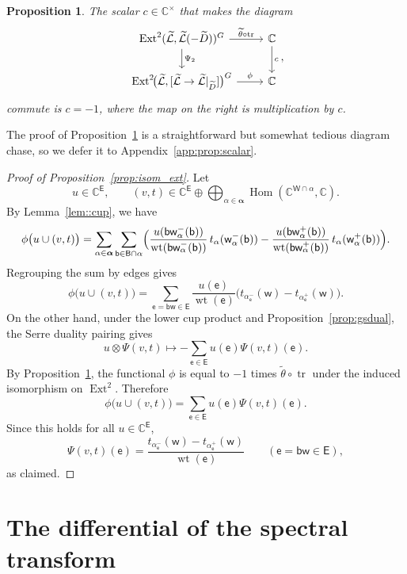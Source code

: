 \documentclass[dvipsnames,11pt]{article}
\newtheorem{proposition}[theorem]{Proposition}
\theoremstyle{definition}
\newcommand{\wt}{\operatorname{wt}}
\newcommand{\C}{{\mathbb C}}
\def\B{\mathsf B}
\def\W{\mathsf W}
\def\w{\mathsf w}
\def\b{\mathsf b}
\def\e{\mathsf e}
\def\E{\mathsf E}
\def\zz{\bm \alpha}
\def\Ext{\operatorname{Ext}}
\def\Ext{\operatorname{Ext}}
\DeclareMathOperator{\Hom}{Hom}
\DeclareMathOperator{\tr}{tr}
\begin{document}
\begin{proposition} \label{prop:scalar}
The scalar $c \in \C^\times$ that makes the diagram
\[
\begin{tikzcd}
 \Ext^2(\widetilde{\mathcal L},\widetilde{\mathcal L}(-\widetilde D))^G \arrow[r,"{\widetilde \theta\circ\tr}"]  \arrow[d,"\Psi_2"]
& \C \arrow[d,"c"]\\
\Ext^2\!\bigl(\widetilde{\mathcal L},[\widetilde{\mathcal L}\to \widetilde{\mathcal L}|_{\widetilde D}]\bigr)^G  \arrow[r,"\phi"]
&  \C
\end{tikzcd},
\]
commute is $c=-1$, where the map on the right is multiplication by $c$. 
\end{proposition}

The proof of Proposition~\ref{prop:scalar} is a straightforward but somewhat tedious diagram chase, so we defer it to Appendix~\ref{app:prop:scalar}.

\begin{proof}[Proof of Proposition~\ref{prop:isom_ext}]
Let 
\[
u\in \C^\E,
\qquad
(v,t)\in
\C^{\E}\oplus \bigoplus_{\alpha\in \zz}\Hom(\C^{\W\cap \alpha},\C).
\]
By Lemma~\ref{lem::cup}, we have
\[
\phi\bigl(u\cup (v,t)\bigr)
=
\sum_{\alpha\in\zz}\sum_{\b\in\B\cap\alpha}
\Bigl(
\frac{u(\b \w_\alpha^{-}(\b))}{\wt(\b\w_\alpha^{-}(\b))}\,t_\alpha(\w_\alpha^{-}(\b))
-
\frac{u(\b \w_\alpha^{+}(\b))}{\wt(\b\w_\alpha^{+}(\b))}\,t_\alpha(\w_\alpha^{+}(\b))
\Bigr).
\]
Regrouping the sum by edges gives
\[
\phi\bigl(u\cup (v,t)\bigr)
=
\sum_{\e=\b\w\in\E}
\frac{u(\e)}{\wt(\e)}
\bigl(t_{\alpha_\e^-}(\w)-t_{\alpha_\e^+}(\w)\bigr).
\]
On the other hand, under the lower cup product and Proposition~\ref{prop:gsdual}, the Serre duality pairing gives
\[
u\otimes \Psi(v,t) \longmapsto -\sum_{\e\in\E}u(\e)\Psi(v,t)(\e).
\]
By Proposition~\ref{prop:scalar}, the functional \(\phi\) is equal to \(-1\) times \(\widetilde\theta\circ\tr\) under the induced isomorphism on \(\Ext^2\). Therefore
\[
\phi\bigl(u\cup (v,t)\bigr)
=
\sum_{\e\in\E}u(\e)\Psi(v,t)(\e).
\]
Since this holds for all \(u\in \C^\E\),
\[
\Psi(v,t)(\e)
=
\frac{t_{\alpha_\e^-}(\w)-t_{\alpha_\e^+}(\w)}{\wt(\e)}
\qquad (\e=\b\w\in\E),
\]
as claimed.
\end{proof}








\section{The differential of the spectral transform}
\label{sec:diff_kappa}
\end{document}
